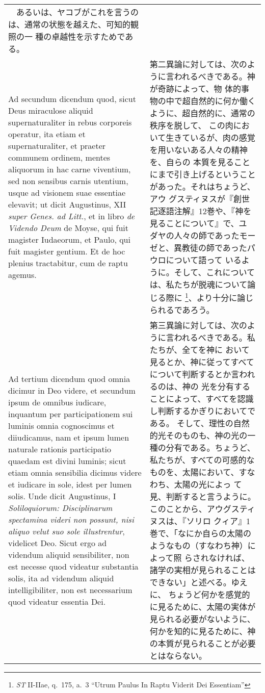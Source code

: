 \documentclass[10pt]{jsarticle} %
\begin{document}
\begin{longtable}{p{21em}p{21em}}
　あるいは、ヤコブがこれを言うのは、通常の状態を越えた、可知的観照の一
 種の卓越性を示すためである。

\\

{\sc Ad secundum dicendum} quod, sicut Deus miraculose aliquid
supernaturaliter in rebus corporeis operatur, ita etiam et
supernaturaliter, et praeter communem ordinem, mentes aliquorum in hac
carne viventium, sed non sensibus carnis utentium, usque ad visionem
suae essentiae elevavit; ut dicit Augustinus, XII {\it super Genes. ad
Litt.}, et in libro {\it de Videndo Deum} de Moyse, qui fuit magister
Iudaeorum, et Paulo, qui fuit magister gentium. Et de hoc plenius
tractabitur, cum de raptu agemus.

&

第二異論に対しては、次のように言われるべきである。神が奇跡によって、物
体的事物の中で超自然的に何か働くように、超自然的に、通常の秩序を脱して、
この肉において生きているが、肉の感覚を用いないある人々の精神を、自らの
本質を見ることにまで引き上げるということがあった。それはちょうど、アウ
グスティヌスが『創世記逐語注解』12巻や、『神を見ることについて』で、ユ
ダヤの人々の師であったモーゼと、異教徒の師であったパウロについて語って
いるように。そして、これについては、私たちが脱魂について論じる際に
\footnote{{\it ST} II-IIae, q.~175, a.~3 ``Utrum Paulus In Raptu
Viderit Dei Essentiam''}、より十分に論じられるであろう。

\\

{\sc Ad tertium dicendum} quod omnia dicimur in Deo videre, et
secundum ipsum de omnibus iudicare, inquantum per participationem sui
luminis omnia cognoscimus et diiudicamus, nam et ipsum lumen naturale
rationis participatio quaedam est divini luminis; sicut etiam omnia
sensibilia dicimus videre et iudicare in sole, idest per lumen
solis. Unde dicit Augustinus, I {\it Soliloquiorum: Disciplinarum
spectamina videri non possunt, nisi aliquo velut suo sole
illustrentur}, videlicet Deo. Sicut ergo ad videndum aliquid
sensibiliter, non est necesse quod videatur substantia solis, ita ad
videndum aliquid intelligibiliter, non est necessarium quod videatur
essentia Dei.

&

第三異論に対しては、次のように言われるべきである。私たちが、全てを神に
おいて見るとか、神に従ってすべてについて判断するとか言われるのは、神の
光を分有することによって、すべてを認識し判断するかぎりにおいてである。
そして、理性の自然的光そのものも、神の光の一種の分有である。ちょうど、
私たちが、すべての可感的なものを、太陽において、すなわち、太陽の光によっ
て見、判断すると言うように。このことから、アウグスティヌスは、『ソリロ
クィア』1巻で、「なにか自らの太陽のようなもの（すなわち神）によって照
らされなければ、諸学の実相が見られることはできない」と述べる。ゆえに、
ちょうど何かを感覚的に見るために、太陽の実体が見られる必要がないように、
何かを知的に見るために、神の本質が見られることが必要とはならない。


\end{longtable}
\end{document}
